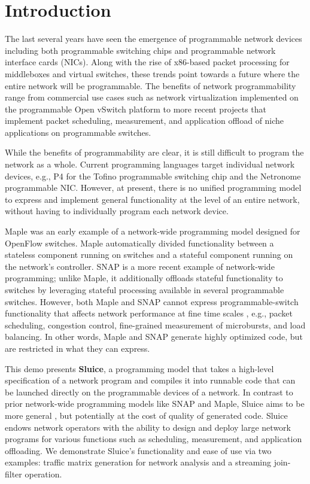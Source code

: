 \section{Introduction}
The last several years have seen the emergence of programmable network devices
including both programmable switching chips and programmable network interface
cards (NICs). Along with the rise of x86-based packet processing for
middleboxes and virtual switches, these trends point towards a future where the
entire network will be programmable. The benefits of network programmability
range from commercial use cases such as network virtualization implemented on
the programmable Open vSwitch platform to more recent projects that implement
packet scheduling, measurement, and application offload of niche applications
on programmable switches.

While the benefits of programmability are clear, it is still difficult to
program the network as a whole.  Current programming languages target individual
network devices, e.g., P4 for the Tofino programmable switching chip and the
Netronome programmable NIC. However, at present, there is no unified
programming model to express and implement general functionality at the level
of an entire network, without having to individually program each network
device.

Maple was an early example of a network-wide programming model designed
for OpenFlow switches. Maple automatically divided functionality between a
stateless component running on switches and a stateful component running on the
network's controller. SNAP is a more recent example of network-wide
programming; unlike Maple, it additionally offloads stateful functionality to
switches by leveraging stateful processing available in several  programmable switches. However, both Maple
and SNAP cannot express programmable-switch functionality that affects network
performance at fine time scales , e.g.,
packet scheduling, congestion control, fine-grained measurement of microbursts,
and load balancing. In other words, Maple and SNAP generate highly optimized
code, but are restricted in what they can express.

This demo presents \textbf{Sluice}, a programming model that takes a high-level
specification of a network program and compiles it into runnable code that can
be launched directly on the programmable devices of a network. In contrast to
prior network-wide programming models like SNAP and Maple, Sluice aims to be
more general , but potentially at the cost of quality of generated code.
Sluice endows network operators with the ability to design and deploy large
network programs for various functions such as scheduling, measurement, and
application offloading.  We demonstrate Sluice's functionality and ease of use
via two examples: traffic matrix generation for network analysis and a
streaming join-filter operation.

